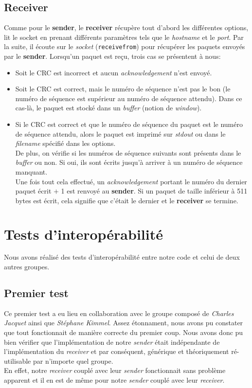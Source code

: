 \documentclass[11pt]{article}
\begin{document}
\subsection{Receiver}
Comme pour le \textbf{sender}, le \textbf{receiver} récupère tout d'abord les différentes options, lit le socket en prenant différents paramètres tels que le \textit{hostname} et le \textit{port}. Par la suite, il écoute sur le \textit{socket} (\texttt{receivefrom}) pour récupérer les paquets envoyés par le \textbf{sender}. Lorsqu'un paquet est reçu, trois cas se présentent à nous:
\begin{itemize}
\item Soit le CRC est incorrect et aucun \textit{acknowledgement} n'est envoyé.
\item Soit le CRC est correct, mais le numéro de séquence n'est pas le bon (le numéro de séquence est supérieur au numéro de séquence attendu). Dans ce cas-là, le paquet est stocké dans un \textit{buffer} (notion de \textit{window}).
\item Si le CRC est correct et que le numéro de séquence du paquet est le numéro de séquence attendu, alors le paquet est imprimé sur \textit{stdout} ou dans le \textit{filename} spécifié dans les options. \\ De plus, on vérifie si les numéros de séquence suivants sont présents dans le \textit{buffer} ou non. Si oui, ils sont écrits jusqu'à arriver à un numéro de séquence manquant. \\ 
Une fois tout cela effectué, un \textit{acknowledgement} portant le numéro du dernier paquet écrit $+$ 1 est renvoyé au \textbf{sender}. Si un paquet de taille inférieur à 511 bytes est écrit, cela signifie que c'était le dernier et le \textbf{receiver} se termine.
\end{itemize}

\section{Tests d'interopérabilité}
Nous avons réalisé des tests d'interopérabilité entre notre code et celui de deux autres groupes. 
\subsection{Premier test}
Ce premier test a eu lieu en collaboration avec le groupe composé de \textit{Charles Jacquet} ainsi que \textit{Stéphane Kimmel}. Assez étonnament, nous avons pu constater que tout fonctionnait de manière correcte du premier coup. Nous avons donc pu bien vérifier que l'implémentation de notre \textit{sender} était indépendante de l'implémentation du \textit{receiver} et par conséquent, générique et théoriquement ré-utilisable par n'importe quel groupe. \\ 
En effet, notre \textit{receiver} couplé avec leur \textit{sender} fonctionnait sans problème apparent et il en est de même pour notre \textit{sender} couplé avec leur \textit{receiver}. 
\end{document}
